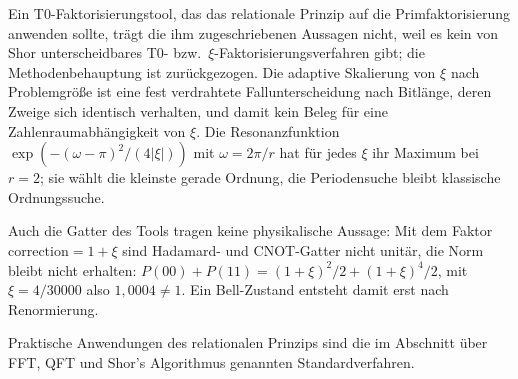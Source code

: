 	Ein T0-Faktorisierungstool, das das relationale Prinzip auf die Primfaktorisierung anwenden sollte, trägt die ihm zugeschriebenen Aussagen nicht, weil es kein von Shor unterscheidbares T0- bzw.\ $\xi$-Faktorisierungsverfahren gibt; die Methodenbehauptung ist zurückgezogen. Die adaptive Skalierung von $\xi$ nach Problemgröße ist eine fest verdrahtete Fallunterscheidung nach Bitlänge, deren Zweige sich identisch verhalten, und damit kein Beleg für eine Zahlenraumabhängigkeit von $\xi$. Die Resonanzfunktion $\exp\left(-(\omega-\pi)^2/(4|\xi|)\right)$ mit $\omega = 2\pi/r$ hat für jedes $\xi$ ihr Maximum bei $r = 2$; sie wählt die kleinste gerade Ordnung, die Periodensuche bleibt klassische Ordnungssuche.
	
	Auch die Gatter des Tools tragen keine physikalische Aussage: Mit dem Faktor $\text{correction} = 1+\xi$ sind Hadamard- und CNOT-Gatter nicht unitär, die Norm bleibt nicht erhalten: $P(00)+P(11) = (1+\xi)^2/2 + (1+\xi)^4/2$, mit $\xi = 4/30000$ also $1{,}0004 \neq 1$. Ein Bell-Zustand entsteht damit erst nach Renormierung.
	
	Praktische Anwendungen des relationalen Prinzips sind die im Abschnitt über FFT, QFT und Shor's Algorithmus genannten Standardverfahren.
